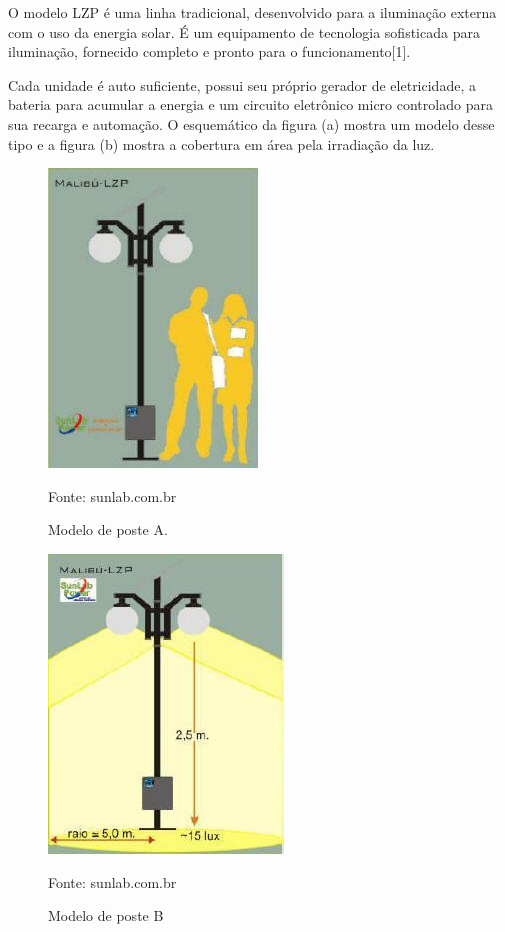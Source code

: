 \begin{itemize}
\begin{enumerate}
	O modelo LZP é uma linha tradicional, desenvolvido para a iluminação externa com o uso da energia solar. É um equipamento de tecnologia sofisticada para iluminação, fornecido completo e pronto para o funcionamento[1].

	Cada unidade é auto suficiente, possui seu próprio gerador de eletricidade,  a bateria para acumular a energia e um circuito eletrônico micro controlado para sua recarga e automação. O esquemático da figura (a) mostra um modelo desse tipo e a figura (b) mostra a cobertura em área pela irradiação da luz.
		
	\end{enumerate}
	
	\begin{figure}[H]
	 \centering
	\label{Modelo de poste A}
	 \includegraphics[keepaspectratio=true,scale=0.8]{postes/3.png}
	 \caption{Modelo de poste A.}
	 \small{Fonte: sunlab.com.br}
	\end{figure}
	
	\begin{figure}[H]
	 \centering
	\label{Modelo de poste B}
	 \includegraphics[keepaspectratio=true,scale=0.8]{postes/4.png}
	 \caption{Modelo de poste B}
	 \small{Fonte: sunlab.com.br}
	\end{figure}
		

\end{itemize}
